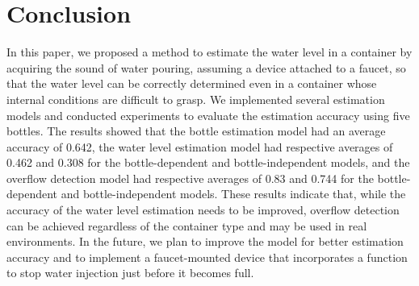 \documentclass[sigconf,authordraft]{acmart}
\begin{document}
\section{Conclusion}
\label{sec:conclution}
In this paper, we proposed a method to estimate the water level in a container by acquiring the sound of water pouring, assuming a device attached to a faucet, so that the water level can be correctly determined even in a container whose internal conditions are difficult to grasp. We implemented several estimation models and conducted experiments to evaluate the estimation accuracy using five bottles. The results showed that the bottle estimation model had an average accuracy of 0.642, the water level estimation model had respective averages of 0.462 and 0.308 for the bottle-dependent and bottle-independent models, and the overflow detection model had respective averages of 0.83 and 0.744 for the bottle-dependent and bottle-independent models. These results indicate that, while the accuracy of the water level estimation needs to be improved, overflow detection can be achieved regardless of the container type and may be used in real environments. In the future, we plan to improve the model for better estimation accuracy and to implement a faucet-mounted device that incorporates a function to stop water injection just before it becomes full.








\end{document}
